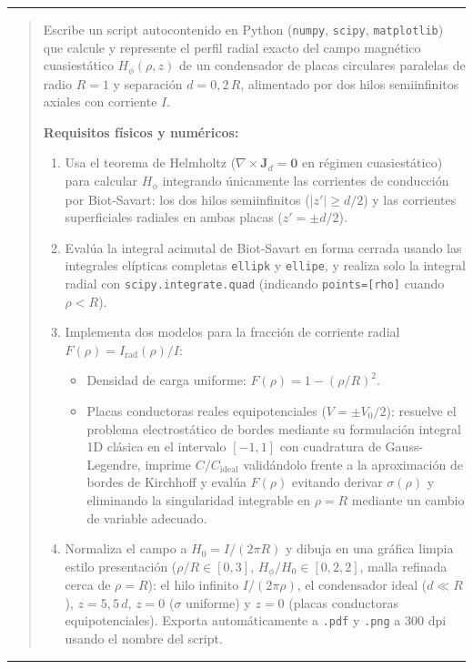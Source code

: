 \documentclass[11pt]{article}
\begin{document}
\noindent\color{mutedgray}\rule{\linewidth}{0.5pt}\color{black}
\begin{quote}
Escribe un script autocontenido en Python (\texttt{numpy}, \texttt{scipy}, \texttt{matplotlib}) que calcule y represente el perfil radial exacto del campo magnético cuasiestático $H_\phi(\rho, z)$ de un condensador de placas circulares paralelas de radio $R=1$ y separación $d = 0{,}2\,R$, alimentado por dos hilos semiinfinitos axiales con corriente $I$.

\textbf{Requisitos físicos y numéricos:}
\begin{enumerate}
    \item Usa el teorema de Helmholtz ($\nabla \times \mathbf{J}_d = \mathbf{0}$ en régimen cuasiestático) para calcular $H_\phi$ integrando únicamente las corrientes de conducción por Biot-Savart: los dos hilos semiinfinitos ($|z'| \ge d/2$) y las corrientes superficiales radiales en ambas placas ($z' = \pm d/2$).
    \item Evalúa la integral acimutal de Biot-Savart en forma cerrada usando las integrales elípticas completas \texttt{ellipk} y \texttt{ellipe}, y realiza solo la integral radial con \texttt{scipy.integrate.quad} (indicando \texttt{points=[rho]} cuando $\rho < R$).
    \item Implementa dos modelos para la fracción de corriente radial $F(\rho) = I_{\mathrm{rad}}(\rho)/I$:
    \begin{itemize}
        \item Densidad de carga uniforme: $F(\rho) = 1 - (\rho/R)^2$.
        \item Placas conductoras reales equipotenciales ($V = \pm V_0/2$): resuelve el problema electrostático de bordes mediante su formulación integral 1D clásica en el intervalo $[-1, 1]$ con cuadratura de Gauss-Legendre, imprime $C/C_{\mathrm{ideal}}$ validándolo frente a la aproximación de bordes de Kirchhoff y evalúa $F(\rho)$ evitando derivar $\sigma(\rho)$ y eliminando la singularidad integrable en $\rho = R$ mediante un cambio de variable adecuado.
    \end{itemize}
    \item Normaliza el campo a $H_0 = I/(2\pi R)$ y dibuja en una gráfica limpia estilo presentación ($\rho/R \in [0, 3]$, $H_\phi/H_0 \in [0, 2{,}2]$, malla refinada cerca de $\rho = R$): el hilo infinito $I/(2\pi\rho)$, el condensador ideal ($d \ll R$), $z = 5{,}5\,d$, $z = 0$ ($\sigma$ uniforme) y $z = 0$ (placas conductoras equipotenciales). Exporta automáticamente a \texttt{.pdf} y \texttt{.png} a 300 dpi usando el nombre del script.
\end{enumerate}
\end{quote}
\noindent\color{mutedgray}\rule{\linewidth}{0.5pt}\color{black}
\end{document}
